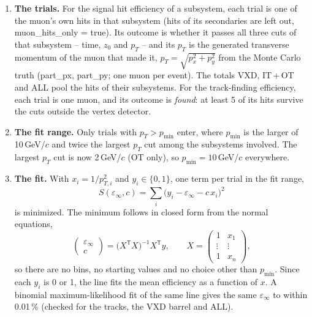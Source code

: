 \documentclass[11pt,letterpaper]{article}
\newcommand{\code}[1]{{\fontencoding{OT1}\fontfamily{cmtt}\selectfont #1}}
\newcommand{\pT}{p_T}
\newcommand{\einf}{\varepsilon_\infty}
\begin{document}
\begin{enumerate}[leftmargin=*,label=\textbf{\arabic*.}]
\item \textbf{The trials.} For the signal hit efficiency of a subsystem, each trial is one of the muon's own hits
in that subsystem (hits of its secondaries are left out, \code{muon\_hits\_only = true}). Its outcome is whether
it passes all three cuts of that subsystem -- time, $z_0$ and $\pT$ -- and its $\pT$ is the generated transverse
momentum of the muon that made it, $\pT = \sqrt{p_x^2 + p_y^2}$ from the Monte Carlo truth
(\code{part\_px}, \code{part\_py}; one muon per event). The totals VXD, IT\,+\,OT and ALL pool the hits of
their subsystems. For the track-finding efficiency, each trial is one muon, and its outcome is \emph{found}: at
least 5 of its hits survive the cuts outside the vertex detector.

\item \textbf{The fit range.} Only trials with $\pT > p_{\min}$ enter, where $p_{\min}$ is the larger of
10\,GeV/$c$ and twice the largest $\pT$ cut among the subsystems involved. The largest $\pT$ cut is now
2\,GeV/$c$ (OT only), so $p_{\min} = 10$\,GeV/$c$ everywhere.

\item \textbf{The fit.} With $x_i = 1/p_{T,i}^2$ and $y_i \in \{0, 1\}$, one term per trial in the fit range,
\begin{equation}
S(\einf, c) = \sum_i \bigl(y_i - \einf - c\,x_i\bigr)^2
\end{equation}
is minimized. The minimum follows in closed form from the normal equations,
\begin{equation}
\begin{pmatrix}\einf\\ c\end{pmatrix} = \bigl(X^{\mathsf T}X\bigr)^{-1}X^{\mathsf T}y ,
\qquad X = \begin{pmatrix}1 & x_1\\ \vdots & \vdots\\ 1 & x_n\end{pmatrix},
\end{equation}
so there are no bins, no starting values and no choice other than $p_{\min}$. Since each $y_i$ is 0 or 1, the
line fits the mean efficiency as a function of $x$. A binomial maximum-likelihood fit of the same line gives the
same $\einf$ to within 0.01\,\% (checked for the tracks, the VXD barrel and ALL).


\end{enumerate}
\end{document}
